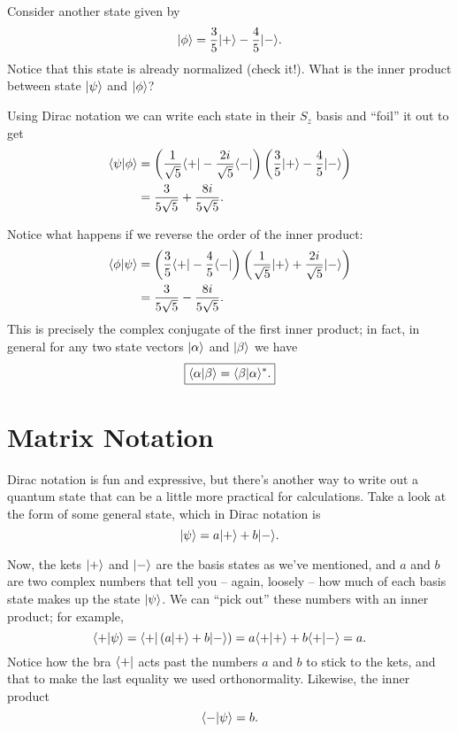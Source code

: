 \begin{example}  Consider another state given by
\begin{equation}
| \phi \rangle = \frac{3}{5} | + \rangle - \frac{4}{5} | - \rangle.
\end{equation}
Notice that this state is already normalized (check it!).  What is the inner product between state $| \psi \rangle$ and $| \phi \rangle$?

Using Dirac notation we can write each state in their $S_z$ basis and ``foil'' it out to get
\begin{align*}
\langle \psi | \phi \rangle & =  \left( \frac{1}{\sqrt{5}}\langle + | - \frac{2i}{\sqrt{5}} \langle - | \right) \left(\frac{3}{5} | + \rangle - \frac{4}{5} | - \rangle \right) \\
& = \frac{3}{5\sqrt{5}} + \frac{8i}{5\sqrt{5}}.
\end{align*}

Notice what happens if we reverse the order of the inner product:
\begin{align*}
\langle \phi | \psi \rangle & =   \left(\frac{3}{5} \langle + | - \frac{4}{5} \langle - | \right) \left( \frac{1}{\sqrt{5}}| + \rangle + \frac{2i}{\sqrt{5}} | - \rangle \right) \\
& = \frac{3}{5\sqrt{5}} - \frac{8i}{5\sqrt{5}}.
\end{align*}
This is precisely the complex conjugate of the first inner product; in fact, in general for any two state vectors $| \alpha \rangle$ and $| \beta \rangle$ we have
\begin{equation}
\boxed{
\langle \alpha | \beta \rangle = \langle \beta | \alpha \rangle^*.
}
\end{equation}
\end{example}

\section{Matrix Notation}

Dirac notation is fun and expressive, but there's another way to write out a quantum state that can be a little more practical for calculations.  Take a look at the form of some general state, which in Dirac notation is
\begin{equation}
| \psi \rangle = a | + \rangle + b | - \rangle.
\end{equation}

Now, the kets $| + \rangle$ and $| - \rangle$ are the basis states as we've mentioned, and $a$ and $b$ are two complex numbers that tell you -- again, loosely -- how much of each basis state makes up the state $| \psi \rangle$.  We can ``pick out'' these numbers with an inner product; for example,
\[
\langle + | \psi \rangle = \langle + | \left( a | + \rangle + b | - \rangle \right) = a \langle + | + \rangle + b \langle + | - \rangle = a.
\]
Notice how the bra $\langle + |$ acts past the numbers $a$ and $b$ to stick to the kets, and that to make the last equality we used orthonormality. Likewise, the inner product 
\[
\langle - | \psi \rangle = b.
\]

